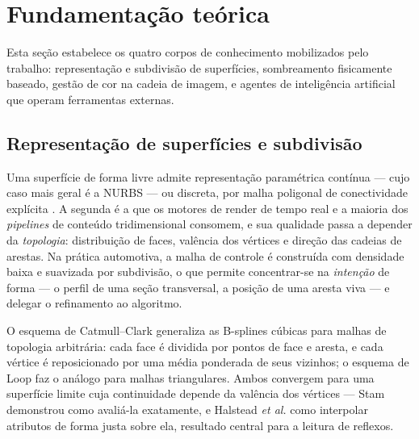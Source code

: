 \section{Fundamenta\c{c}\~ao te\'orica}
\label{sec:fundamentacao}

Esta se\c{c}\~ao estabelece os quatro corpos de conhecimento mobilizados pelo trabalho:
representa\c{c}\~ao e subdivis\~ao de superf\'icies, sombreamento fisicamente baseado,
gest\~ao de cor na cadeia de imagem, e agentes de intelig\^encia artificial que operam
ferramentas externas.

\subsection{Representa\c{c}\~ao de superf\'icies e subdivis\~ao}

Uma superf\'icie de forma livre admite representa\c{c}\~ao param\'etrica cont\'inua --- cujo
caso mais geral \'e a NURBS \cite{piegl1997} --- ou discreta, por malha poligonal de
conectividade expl\'icita \cite{bbotsch2010}. A segunda \'e a que os motores de render de
tempo real e a maioria dos \emph{pipelines} de conte\'udo tridimensional consomem, e sua
qualidade passa a depender da \emph{topologia}: distribui\c{c}\~ao de faces, val\^encia dos
v\'ertices e dire\c{c}\~ao das cadeias de arestas. Na pr\'atica automotiva, a malha de
controle \'e constru\'ida com densidade baixa e suavizada por subdivis\~ao, o que permite
concentrar-se na \emph{inten\c{c}\~ao} de forma --- o perfil de uma se\c{c}\~ao
transversal, a posi\c{c}\~ao de uma aresta viva --- e delegar o refinamento ao algoritmo.

O esquema de Catmull--Clark \cite{catmull1978} generaliza as B-splines c\'ubicas para
malhas de topologia arbitr\'aria: cada face \'e dividida por pontos de face e aresta, e cada
v\'ertice \'e reposicionado por uma m\'edia ponderada de seus vizinhos; o esquema de Loop
\cite{loop1987} faz o an\'alogo para malhas triangulares. Ambos convergem para uma
superf\'icie limite cuja continuidade depende da val\^encia dos v\'ertices --- Stam
\cite{stam1998} demonstrou como avali\'a-la exatamente, e Halstead \emph{et al.}
\cite{halstead1993} como interpolar atributos de forma justa sobre ela, resultado central
para a leitura de reflexos.

